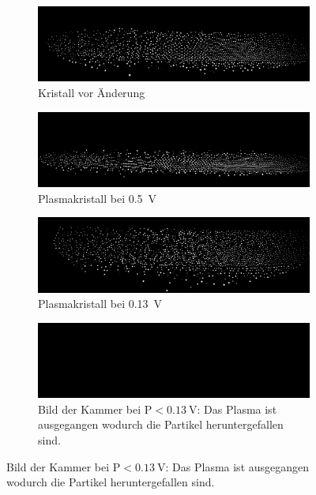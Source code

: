 \documentclass[12pt,a4paper,ngerman]{report}
\begin{document}
	\begin{figure}
		\centering
		\begin{subfigure}[b]{0.45\textwidth}
			\includegraphics[width=\textwidth]{data/Export/ausgangszustand_vorSpannungsaenderung.png}
			\caption{Kristall vor Änderung}
			\label{fig:Spannungsänderung_sub1}
		\end{subfigure}
		\hfill %
		\begin{subfigure}[b]{0.45\textwidth}
			\includegraphics[width=\textwidth]{data/Export/ausgangszustand_spannung_0.5V.png}
			\caption[Spannungsänderung 1]{Plasmakristall bei \qty{0,5}{\volt}}
			\label{fig:Spannungsänderung_sub2}
		\end{subfigure}
		
		\begin{subfigure}[b]{0.45\textwidth}
			\includegraphics[width=\textwidth]{data/Export/ausgangszustand_spannung_0.13V.png}
			\caption[Spannungsänderung 2]{Plasmakristall bei \qty{0,13}{\volt}}
			\label{fig:Spannungsänderung_sub3}
		\end{subfigure}
		\hfill %
		\begin{subfigure}[b]{0.45\textwidth}
			\includegraphics[width=\textwidth]{data/Export/start.png}
			\caption[Leere Kammer]{Bild der Kammer bei $\mathrm{P}<\qty{0,13}{\volt}$: Das Plasma ist ausgegangen wodurch die Partikel heruntergefallen sind.}
			\label{fig:Spannungsänderung_sub4}
		\end{subfigure}
		

\end{figure}
\end{document}
